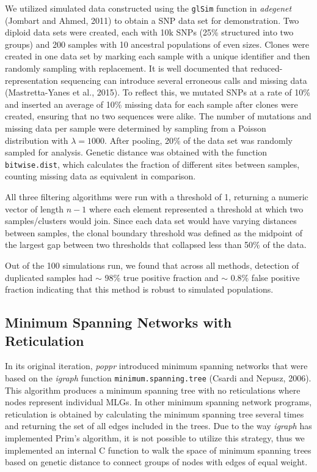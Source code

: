 \documentclass{frontiersSCNS} %
\begin{document}
We utilized simulated data constructed using the \texttt{glSim} function
in \emph{adegenet} (Jombart and Ahmed, 2011) to obtain a SNP data set
for demonstration. Two diploid data sets were created, each with 10k
SNPs (25\% structured into two groups) and 200 samples with 10 ancestral
populations of even sizes. Clones were created in one data set by
marking each sample with a unique identifier and then randomly sampling
with replacement. It is well documented that reduced-representation
sequencing can introduce several erroneous calls and missing data
(Mastretta-Yanes et al., 2015). To reflect this, we mutated SNPs at a
rate of 10\% and inserted an average of 10\% missing data for each
sample after clones were created, ensuring that no two sequences were
alike. The number of mutations and missing data per sample were
determined by sampling from a Poisson distribution with
\(\lambda = 1000\). After pooling, 20\% of the data set was randomly
sampled for analysis. Genetic distance was obtained with the function
\texttt{bitwise.dist}, which calculates the fraction of different sites
between samples, counting missing data as equivalent in comparison.

All three filtering algorithms were run with a threshold of 1, returning
a numeric vector of length \(n - 1\) where each element represented a
threshold at which two samples/clusters would join. Since each data set
would have varying distances between samples, the clonal boundary
threshold was defined as the midpoint of the largest gap between two
thresholds that collapsed less than 50\% of the data.

Out of the 100 simulations run, we found that across all methods,
detection of duplicated samples had \(\sim\) 98\% true positive fraction
and \(\sim\) 0.8\% false positive fraction indicating that this method
is robust to simulated populations.

\subsection*{Minimum Spanning Networks with
Reticulation}\label{minimum-spanning-networks-with-reticulation}

In its original iteration, \emph{poppr} introduced minimum spanning
networks that were based on the \emph{igraph} function
\texttt{minimum.spanning.tree} (Csardi and Nepusz, 2006). This algorithm
produces a minimum spanning tree with no reticulations where nodes
represent individual MLGs. In other minimum spanning network programs,
reticulation is obtained by calculating the minimum spanning tree
several times and returning the set of all edges included in the trees.
Due to the way \emph{igraph} has implemented Prim's algorithm, it is not
possible to utilize this strategy, thus we implemented an internal C
function to walk the space of minimum spanning trees based on genetic
distance to connect groups of nodes with edges of equal weight.
\end{document}
